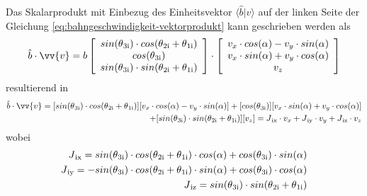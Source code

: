 \documentclass[Bachelor, BMR, ngerman]{twbook}
\begin{document}
    \noindent
    Das Skalarprodukt mit Einbezug des Einheitsvektor $\langle \hat{b} | v \rangle$ auf der linken Seite der Gleichung \ref{eq:bahngeschwindigkeit-vektorprodukt} kann geschrieben werden als
    \newline
    \begin{align}
        \hat{b} \cdot \vv{v} = 
        b 
        \left[
            \begin{array}{c} 
                sin(\theta\textsubscript{3i}) \cdot cos(\theta\textsubscript{2i} + \theta\textsubscript{1i})\\
                cos(\theta\textsubscript{3i})\\
                sin(\theta\textsubscript{3i}) \cdot
                sin(\theta\textsubscript{2i} + \theta\textsubscript{1i})
            \end{array}
        \right] \cdot 
        \left[
            \begin{array}{c} 
                v_x \cdot cos(\alpha) - v_y \cdot sin(\alpha)\\
                v_x \cdot sin(\alpha) + v_y \cdot cos(\alpha)\\
                v_z
            \end{array}
        \right]
        \label{eq:skalarprodukt}
    \end{align}
    \noindent
    resultierend in
    \begin{align}
        \hat{b} \cdot \vv{v} =
        [sin(\theta\textsubscript{3i}) \cdot cos(\theta\textsubscript{2i} + \theta\textsubscript{1i})][v_x \cdot cos(\alpha) - v_y \cdot sin(\alpha)] +
        [cos(\theta\textsubscript{3i})][v_x \cdot sin(\alpha) + v_y \cdot cos(\alpha)] \nonumber \\ +
        [sin(\theta\textsubscript{3i}) \cdot sin(\theta\textsubscript{2i} + \theta\textsubscript{1i})][v_z] = J\textsubscript{ix} \cdot v_x + J\textsubscript{iy} \cdot v_y + J\textsubscript{iz} \cdot v_z
        \label{eq:vektorprodukt}
    \end{align}
    \noindent
    wobei
    \newline
    \begin{align}
        J\textsubscript{ix} = sin(\theta\textsubscript{3i}) \cdot cos(\theta\textsubscript{2i} + \theta\textsubscript{1i}) \cdot cos(\alpha) + cos(\theta\textsubscript{3i}) \cdot sin(\alpha) \nonumber \\
        J\textsubscript{iy} = - sin(\theta\textsubscript{3i}) \cdot cos(\theta\textsubscript{2i} + \theta\textsubscript{1i}) \cdot sin(\alpha) + cos(\theta\textsubscript{3i}) \cdot cos(\alpha) \nonumber \\
        J\textsubscript{iz} = sin(\theta\textsubscript{3i}) \cdot sin(\theta\textsubscript{2i} + \theta\textsubscript{1i}) 
        \label{eq:J}
    \end{align}
\end{document}
